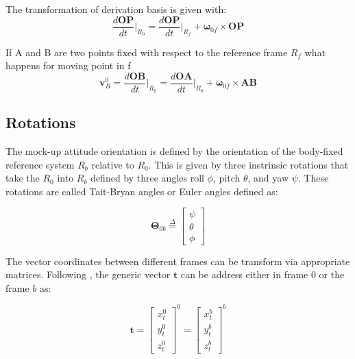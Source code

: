 \documentclass{article}
\begin{document}
The transformation of derivation basis is given with:
\begin{equation}
 \frac{d \mathbf{OP}}{dt}\Biggr\rvert_{R_0} =  \frac{d \mathbf{OP}}{dt}\Biggr\rvert_{R_f} + \mathbf{\omega}_{0f} \times  \mathbf{OP}
\end{equation}

If A and B are two points fixed with respect to the reference frame $R_f$ {\color{blue} what happens for moving point in f}
\begin{equation}
 \mathbf{v}_B^0 = \frac{d \mathbf{OB}}{dt}\Biggr\rvert_{R_0} =  \frac{d \mathbf{OA}}{dt}\Biggr\rvert_{R_0} + \mathbf{\omega}_{0f} \times  \mathbf{AB}
\end{equation}

\subsection{Rotations}

The mock-up attitude orientation is defined by the orientation of the body-fixed reference system $R_b$ relative to $R_0$. This is given by three instrinsic rotations that take the $R_0$ into $R_b$ defined by three angles roll $\phi $,  pitch $\theta$, and yaw $\psi$.
These rotations are called Tait-Bryan angles or Euler angles defined as: 

\begin{equation}
\mathbf{\Theta}_{0b} \stackrel{\Delta}{=} 
\begin{bmatrix}
\psi \\
\theta \\
\phi
\end{bmatrix} 
\end{equation}


The vector coordinates between different frames can be transform via appropriate matrices. Following \cite{perez2005ship}, the generic vector $\textbf{t}$ can be address either in frame $0$ or the frame $b$ as:

\begin{equation}
	\textbf{t}= \begin{bmatrix}
	x_{t}^0 \\
	y_{t}^0\\
	z_{t}^0
	\end{bmatrix}^0 
=  \begin{bmatrix}
	x_{t}^b \\
	y_{t}^b\\
	z_{t}^b
	\end{bmatrix}^b
\end{equation}
\end{document}
